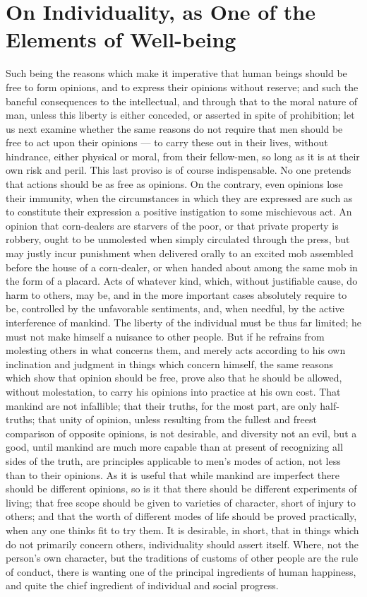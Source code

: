 \documentclass[12pt]{report}
\begin{document}
\chapter{On Individuality, as One of the Elements of Well-being}
Such being the reasons which make it imperative that human beings should be free to form opinions, and to express their opinions without reserve; and such the baneful consequences to the intellectual, and through that to the moral nature of man, unless this liberty is either conceded, or asserted in spite of prohibition; let us next examine whether the same reasons do not require that men should be free to act upon their opinions — to carry these out in their lives, without hindrance, either physical or moral, from their fellow-men, so long as it is at their own risk and peril. This last proviso is of course indispensable. No one pretends that actions should be as free as opinions. On the contrary, even opinions lose their immunity, when the circumstances in which they are expressed are such as to constitute their expression a positive instigation to some mischievous act. An opinion that corn-dealers are starvers of the poor, or that private property is robbery, ought to be unmolested when simply circulated through the press, but may justly incur punishment when delivered orally to an excited mob assembled before the house of a corn-dealer, or when handed about among the same mob in the form of a placard. Acts of whatever kind, which, without justifiable cause, do harm to others, may be, and in the more important cases absolutely require to be, controlled by the unfavorable sentiments, and, when needful, by the active interference of mankind. The liberty of the individual must be thus far limited; he must not make himself a nuisance to other people. But if he refrains from molesting others in what concerns them, and merely acts according to his own inclination and judgment in things which concern himself, the same reasons which show that opinion should be free, prove also that he should be allowed, without molestation, to carry his opinions into practice at his own cost. That mankind are not infallible; that their truths, for the most part, are only half-truths; that unity of opinion, unless resulting from the fullest and freest comparison of opposite opinions, is not desirable, and diversity not an evil, but a good, until mankind are much more capable than at present of recognizing all sides of the truth, are principles applicable to men's modes of action, not less than to their opinions. As it is useful that while mankind are imperfect there should be different opinions, so is it that there should be different experiments of living; that free scope should be given to varieties of character, short of injury to others; and that the worth of different modes of life should be proved practically, when any one thinks fit to try them. It is desirable, in short, that in things which do not primarily concern others, individuality should assert itself. Where, not the person's own character, but the traditions of customs of other people are the rule of conduct, there is wanting one of the principal ingredients of human happiness, and quite the chief ingredient of individual and social progress.
\end{document}
